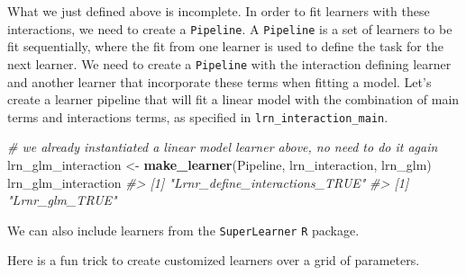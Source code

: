 \documentclass[12pt, krantz2,]{krantz}
\newenvironment{Shaded}{\begin{snugshade}}{\end{snugshade}}
\newcommand{\CommentTok}[1]{\textcolor[rgb]{0.37,0.37,0.37}{\textit{#1}}}
\newcommand{\KeywordTok}[1]{\textcolor[rgb]{0.27,0.27,0.27}{\textbf{#1}}}
\newcommand{\NormalTok}[1]{#1}
\newcommand{\OperatorTok}[1]{\textcolor[rgb]{0.43,0.43,0.43}{\textbf{#1}}}
\newcommand{\StringTok}[1]{\textcolor[rgb]{0.5,0.5,0.5}{#1}}
\theoremstyle{definition}
\theoremstyle{definition}
\theoremstyle{definition}
\newcommand{\1}{\mathbbm{1}}
\begin{document}
What we just defined above is incomplete. In order to fit learners with these
interactions, we need to create a \texttt{Pipeline}. A \texttt{Pipeline} is a set of learners
to be fit sequentially, where the fit from one learner is used to define the
task for the next learner. We need to create a \texttt{Pipeline} with the interaction
defining learner and another learner that incorporate these terms when fitting
a model. Let's create a learner pipeline that will fit a linear model with the
combination of main terms and interactions terms, as specified in
\texttt{lrn\_interaction\_main}.

\begin{Shaded}
\begin{Highlighting}[]
\CommentTok{# we already instantiated a linear model learner above, no need to do it again}
\NormalTok{lrn_glm_interaction <-}\StringTok{ }\KeywordTok{make_learner}\NormalTok{(Pipeline, lrn_interaction, lrn_glm)}
\NormalTok{lrn_glm_interaction}
\CommentTok{#> [1] "Lrnr_define_interactions_TRUE"}
\CommentTok{#> [1] "Lrnr_glm_TRUE"}
\end{Highlighting}
\end{Shaded}

We can also include learners from the \texttt{SuperLearner} \texttt{R} package.

\begin{Shaded}
\end{Shaded}

Here is a fun trick to create customized learners over a grid of parameters.
\end{document}
